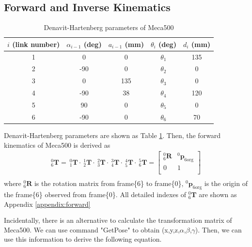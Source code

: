 \subsection{Forward and Inverse Kinematics}
\label{sec:forward}
\begin{table}[htbp]
\centering
\caption{Denavit-Hartenberg parameters of Meca500}
\label{tab:DHtable}
\begin{tabular}{ccccc} 
\hline \hline
$i$ (link number)		&$\alpha _{i-1}$ (deg)	&$a_{i-1}$ (mm)	& $\theta _i$ (deg)			&$d_i$ (mm)	\\
\hline
1   					&0    					&0				&$\theta _1$				&135 \\
2   					&-90   					&0				&$\theta _2$				&0 \\
3  						&0    					&135			&$\theta _3$ 				&0 \\
4   					&-90    				&38				&$\theta _4$ 				&120 \\
5   					&90   					&0				&$\theta _5$ 				&0 \\
6						&-90  					&0				&$\theta _6$ 				&70 \\
\hline\hline
\end{tabular}
\end{table}
Denavit-Hartenberg parameters are shown as Table \ref{tab:DHtable}. Then, the forward kinematics of Meca500 is derived as
\begin{equation}
\begin{split}
^0_6\mathbf{T} =
\ ^0_1\mathbf{T} \cdot \ ^1_2\mathbf{T} \cdot \ ^2_3\mathbf{T} \cdot \ ^3_4\mathbf{T} \cdot \ ^4_5\mathbf{T} \cdot \ ^5_6\mathbf{T} =
\begin{bmatrix}
^0_6\mathbf{R}	&^0\boldsymbol{p}_\mathrm{6org}\\
0				&1\\
\end{bmatrix}\\
\end{split}
\end{equation}\label{eq:translation matrix}
where $^0_6\mathbf{R}$ is the rotation matrix from frame\{6\} to frame\{0\}, $^0\boldsymbol{p}_\mathrm{6org}$ is the origin of the frame\{6\} observed from frame\{0\}. All detailed indexes of $^0_6\mathbf{T}$ are shown as Appendix \ref{appendix:forward}
\par
Incidentally, there is an alternative to calculate the transformation matrix of Meca500. We can use command "GetPose" to obtain (x,y,z,$\alpha$,$\beta$,$\gamma$). Then, we can use this information to derive the following equation.
